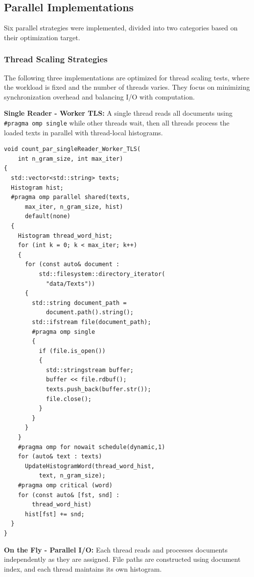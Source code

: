 \documentclass[10pt,twocolumn,letterpaper]{article}
\begin{document}
\subsection{Parallel Implementations}

Six parallel strategies were implemented, divided into two categories based on their optimization target.

\subsubsection{Thread Scaling Strategies}

The following three implementations are optimized for thread scaling tests, where the workload is fixed and the number of threads varies. They focus on minimizing synchronization overhead and balancing I/O with computation.

\textbf{Single Reader - Worker TLS:} A single thread reads all documents using \texttt{\#pragma omp single} while other threads wait, then all threads process the loaded texts in parallel with thread-local histograms.

\begin{lstlisting}
void count_par_singleReader_Worker_TLS(
    int n_gram_size, int max_iter)
{
  std::vector<std::string> texts;
  Histogram hist;
  #pragma omp parallel shared(texts, 
      max_iter, n_gram_size, hist) 
      default(none)
  {
    Histogram thread_word_hist;
    for (int k = 0; k < max_iter; k++)
    {
      for (const auto& document : 
          std::filesystem::directory_iterator(
            "data/Texts"))
      {
        std::string document_path = 
            document.path().string();
        std::ifstream file(document_path);
        #pragma omp single
        {
          if (file.is_open())
          {
            std::stringstream buffer;
            buffer << file.rdbuf();
            texts.push_back(buffer.str());
            file.close();
          }
        }
      }
    }
    #pragma omp for nowait schedule(dynamic,1)
    for (auto& text : texts)
      UpdateHistogramWord(thread_word_hist, 
          text, n_gram_size);
    #pragma omp critical (word)
    for (const auto& [fst, snd] : 
        thread_word_hist)
      hist[fst] += snd;
  }
}
\end{lstlisting}

\textbf{On the Fly - Parallel I/O:} Each thread reads and processes documents independently as they are assigned. File paths are constructed using document index, and each thread maintains its own histogram.
\end{document}
